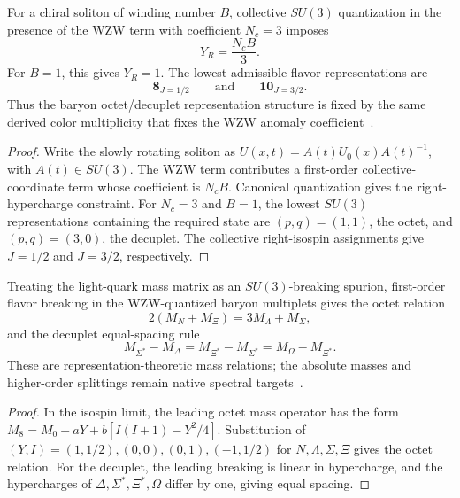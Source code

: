 \documentclass[12pt,a4paper]{article}
\begin{document}
\begin{theorem}
\label{p11:thm:wzw-baryon-multiplet-quantization}
For a chiral soliton of winding number \(B\), collective \(SU(3)\) quantization in the presence of the WZW term with coefficient \(N_c=3\) imposes
\begin{equation}
\label{p11:eq:wzw-right-hypercharge-constraint}
Y_R=\frac{N_cB}{3}.
\end{equation}
For \(B=1\), this gives \(Y_R=1\).  The lowest admissible flavor representations are
\begin{equation}
\label{p11:eq:baryon-octet-decuplet}
\mathbf8_{J=1/2}
\qquad\text{and}\qquad
\mathbf{10}_{J=3/2}.
\end{equation}
Thus the baryon octet/decuplet representation structure is fixed by the same derived color multiplicity that fixes the WZW anomaly coefficient~\cite{Witten1983WZW,Witten1983Baryon}.
\end{theorem}
\begin{proof}
Write the slowly rotating soliton as \(U(x,t)=A(t)U_0(x)A(t)^{-1}\), with \(A(t)\in SU(3)\).  The WZW term contributes a first-order collective-coordinate term whose coefficient is \(N_cB\).  Canonical quantization gives the right-hypercharge constraint.  For \(N_c=3\) and \(B=1\), the lowest \(SU(3)\) representations containing the required state are \((p,q)=(1,1)\), the octet, and \((p,q)=(3,0)\), the decuplet.  The collective right-isospin assignments give \(J=1/2\) and \(J=3/2\), respectively.
\end{proof}

\begin{corollary}
\label{p11:cor:leading-baryon-mass-relations}
Treating the light-quark mass matrix as an \(SU(3)\)-breaking spurion, first-order flavor breaking in the WZW-quantized baryon multiplets gives the octet relation
\begin{equation}
\label{p11:eq:baryon-gell-mann-okubo}
2(M_N+M_\Xi)=3M_\Lambda+M_\Sigma,
\end{equation}
and the decuplet equal-spacing rule
\begin{equation}
\label{p11:eq:decuplet-equal-spacing}
M_{\Sigma^\ast}-M_\Delta
=
M_{\Xi^\ast}-M_{\Sigma^\ast}
=
M_\Omega-M_{\Xi^\ast}.
\end{equation}
These are representation-theoretic mass relations; the absolute masses and higher-order splittings remain native spectral targets~\cite{GellMann1961Eightfold,Okubo1962}.
\end{corollary}
\begin{proof}
In the isospin limit, the leading octet mass operator has the form \(M_8=M_0+aY+b[I(I+1)-Y^2/4]\).  Substitution of \((Y,I)=(1,1/2),(0,0),(0,1),(-1,1/2)\) for \(N,\Lambda,\Sigma,\Xi\) gives the octet relation.  For the decuplet, the leading breaking is linear in hypercharge, and the hypercharges of \(\Delta,\Sigma^\ast,\Xi^\ast,\Omega\) differ by one, giving equal spacing.
\end{proof}
\end{document}
